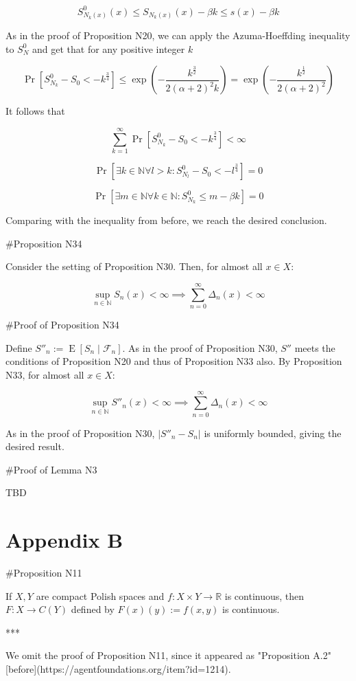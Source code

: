 \documentclass[a4paper]{article}
\DeclareMathOperator{\E}{E}
\newcommand{\Nats}{\mathbb{N}}
\newcommand{\Reals}{\mathbb{R}}
\newcommand{\Abs}[1]{\lvert #1 \rvert}
\newcommand{\F}{\mathcal{F}}
\begin{document}
$$S^0_{N_k(x)}(x) \leq S_{N_k(x)}(x) - \beta k \leq s(x) - \beta k$$

As in the proof of Proposition N20, we can apply the Azuma-Hoeffding inequality to $S^0_N$ and get that for any positive integer $k$

$$\Pr[S^0_{N_k} - S_0 < -k^{\frac{3}{4}}] \leq \exp(-\frac{k^{\frac{3}{2}}}{2(\alpha + 2)^2k})=\exp(-\frac{k^{\frac{1}{2}}}{2(\alpha + 2)^2})$$

It follows that

$$\sum_{k=1}^\infty \Pr[S^0_{N_k} - S_0 < -k^{\frac{3}{4}}] < \infty$$

$$\Pr[\exists k \in \Nats \forall l > k: S^0_{N_l} - S_0 < -l^{\frac{3}{4}}] = 0$$

$$\Pr[\exists m \in \Nats \forall k \in \Nats: S^0_{N_k} \leq m - \beta k] = 0$$

Comparing with the inequality from before, we reach the desired conclusion.

\#Proposition N34

Consider the setting of Proposition N30. Then, for almost all $x \in X$:

$$\sup_{n \in \Nats} S_n(x) < \infty \implies \sum_{n = 0}^\infty \Delta_n(x) < \infty$$

\#Proof of Proposition N34

Define $S''_n:=\E[S_n \mid \F_n]$. As in the proof of Proposition N30, $S''$ meets the conditions of Proposition N20 and thus of Proposition N33 also. By Proposition N33, for almost all $x \in X$:

$$\sup_{n \in \Nats} S''_n(x) < \infty \implies \sum_{n = 0}^\infty \Delta_n(x) < \infty$$

As in the proof of Proposition N30, $\Abs{S''_n-S_n}$ is uniformly bounded, giving the desired result.

\#Proof of Lemma N3

TBD

\section{Appendix B}

\#Proposition N11

If ${X,Y}$ are compact Polish spaces and ${f: X \times Y \rightarrow \Reals}$ is continuous, then ${F: X \rightarrow C(Y)}$ defined by ${F(x)(y):=f(x,y)}$ is continuous.

***

We omit the proof of Proposition N11, since it appeared as "Proposition A.2" [before](https://agentfoundations.org/item?id=1214).
\end{document}
